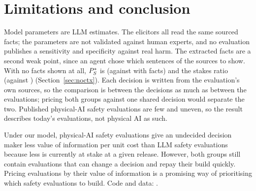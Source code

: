 \section{Limitations and conclusion}
\label{sec:limitations}

Model parameters are LLM estimates. The \voiNMembers{} elicitors all read the same sourced facts; the parameters are not validated against human experts, and no evaluation publishes a sensitivity and specificity against real harm. The extracted facts are a second weak point, since an agent chose which sentences of the sources to show.\ifextended{} \ifdefined\voinoctxEtaStarPSQMed With no facts shown at all, $P_{S}^{*}$ is \voinoctxEtaStarPSQMed{} (against \voiEtaStarPSQMed{} with facts) and the stakes ratio \voinoctxStakesRatio{} (against \voiStakesRatio) (Section~\ref{sec:noctx}).\fi\fi{} %
Each decision is written from the evaluation's own sources, so the comparison is between the decisions as much as between the evaluations; pricing both groups against one shared decision would separate the two. Published physical-AI safety evaluations are few and uneven, so the result describes today's evaluations, not physical AI as such.

\label{sec:conclusion}
Under our model, physical-AI safety evaluations give an undecided decision maker less value of information per unit cost than LLM safety evaluations because less is currently at stake at a given release. However, both groups still contain evaluations that can change a decision and repay their build quickly. Pricing evaluations by their value of information is a promising way of prioritising which safety evaluations to build. Code and data: \anonlink. %
